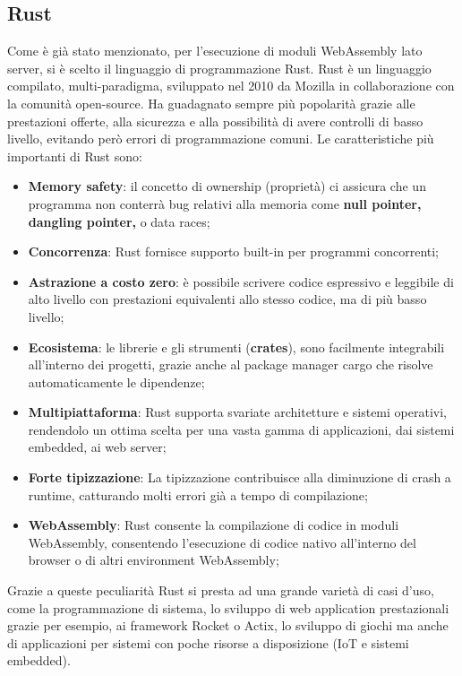 \subsection{Rust}
Come è già stato menzionato, per l'esecuzione di moduli WebAssembly lato server, si è scelto il linguaggio di programmazione Rust.
Rust è un linguaggio compilato, multi-paradigma, sviluppato nel 2010 da Mozilla in collaborazione con la comunità open-source.\cite*{rust}
Ha guadagnato sempre più popolarità grazie alle prestazioni offerte, alla sicurezza e alla possibilità di avere controlli di basso livello, evitando però errori di programmazione comuni.
Le caratteristiche più importanti di Rust sono:
\begin{itemize}
        \item \textbf{Memory safety}: il concetto di ownership (proprietà) ci assicura che un programma non conterrà bug relativi alla memoria come \textbf{null pointer, dangling pointer, } o data races;
        \item \textbf{Concorrenza}: Rust fornisce supporto built-in per programmi concorrenti;
        \item \textbf{Astrazione a costo zero}: è possibile scrivere codice espressivo e leggibile di alto livello con prestazioni equivalenti allo stesso codice, ma di più basso livello;
        \item \textbf{Ecosistema}: le librerie e gli strumenti (\textbf{crates}), sono facilmente integrabili all'interno dei progetti, grazie anche al package manager cargo che risolve automaticamente le dipendenze;
        \item \textbf{Multipiattaforma}: Rust supporta svariate architetture e sistemi operativi, rendendolo un ottima scelta per una vasta gamma di applicazioni, dai sistemi embedded, ai web server;
        \item \textbf{Forte tipizzazione}: La tipizzazione contribuisce alla diminuzione di crash a runtime, catturando molti errori già a tempo di compilazione;
        \item \textbf{WebAssembly}: Rust consente la compilazione di codice in moduli WebAssembly, consentendo l'esecuzione di codice nativo all'interno del browser o di altri environment WebAssembly;
\end{itemize}
Grazie a queste peculiarità Rust si presta ad una grande varietà di casi d'uso, come la programmazione di sistema, lo sviluppo di web application prestazionali grazie per esempio, ai framework Rocket o Actix, lo sviluppo di giochi ma anche di applicazioni per sistemi con poche risorse a disposizione (IoT e sistemi embedded).
\newpage
